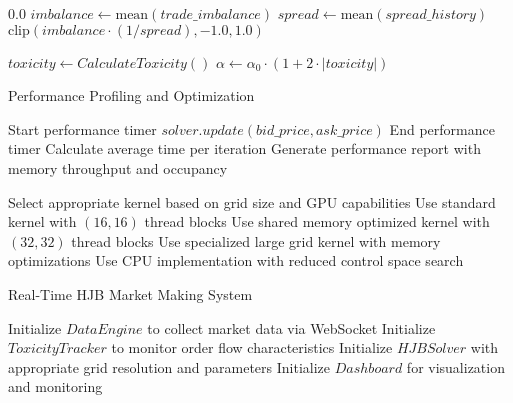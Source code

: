 \documentclass[twocolumn,ieee]{arithmaxresearch}
\begin{document}
\begin{onecolumn}
\begin{onecolumn}
\begin{algorithm}
\begin{algorithmic}[1]
        \State \Return $0.0$
    \EndIf
    \State $imbalance \gets \text{mean}(trade\_imbalance)$
    \State $spread \gets \text{mean}(spread\_history)$
    \State \Return $\text{clip}(imbalance \cdot (1/spread), -1.0, 1.0)$
\EndFunction

\State {}
\State $toxicity \gets CalculateToxicity()$
\State $\alpha \gets \alpha_0 \cdot (1 + 2 \cdot |toxicity|)$ 
\end{algorithmic}
\end{algorithm}


\begin{algorithm}
\caption{Performance Profiling and Optimization}
\begin{algorithmic}[1]
    \State Start performance timer
        \State $solver.update(bid\_price, ask\_price)$
    \EndFor
    \State End performance timer
    \State Calculate average time per iteration
    \State Generate performance report with memory throughput and occupancy
\EndFunction

\State {}
    \State Select appropriate kernel based on grid size and GPU capabilities
        \State Use standard kernel with $(16, 16)$ thread blocks
        \State Use shared memory optimized kernel with $(32, 32)$ thread blocks
    \Else
        \State Use specialized large grid kernel with memory optimizations
    \EndIf
\Else
    \State Use CPU implementation with reduced control space search
\EndIf
\end{algorithmic}
\end{algorithm}

\begin{algorithm}
\caption{Real-Time HJB Market Making System}
\begin{algorithmic}[1]
\State Initialize $DataEngine$ to collect market data via WebSocket
\State Initialize $ToxicityTracker$ to monitor order flow characteristics
\State Initialize $HJBSolver$ with appropriate grid resolution and parameters
\State Initialize $Dashboard$ for visualization and monitoring


\end{algorithmic}
\end{algorithm}
\end{onecolumn}
\end{onecolumn}
\end{document}
